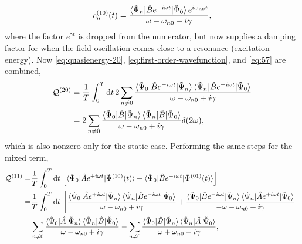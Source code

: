 \documentclass[%
class = book,%
crop = false,%
float = true,%
multi = true,%
preview = false,%
]{standalone}
\begin{document}
\begin{equation}
  \label{eq:57}
  c_{n}^{(10)}(t) = \frac{\braket{\tilde{\Psi}_{n}|\hat{B}e^{-i\omega t}|\tilde{\Psi}_{0}}e^{i\omega_{n0}t}}{\omega - \omega_{n0} + i\gamma},
\end{equation} %
where the factor \(e^{\gamma t}\) is dropped from the numerator, but now supplies a damping factor for when the field oscillation comes close to a resonance (excitation energy). Now \eqref{eq:quasienergy-20}, \eqref{eq:first-order-wavefunction}, and \eqref{eq:57} are combined,
\begin{equation}
  \label{eq:58}
  \begin{aligned}
    \mathcal{Q}^{(20)} &= \frac{1}{T} \int_{0}^{T} \mathrm{d}t \, 2\sum_{n\neq 0} \frac{\braket{\tilde{\Psi}_{0}|\hat{B}e^{-i\omega t}|\tilde{\Psi}_{n}}\braket{\tilde{\Psi}_{n}|\hat{B}e^{-i\omega t}|\tilde{\Psi}_{0}}}{\omega - \omega_{n0} + i\gamma} \\
    &= 2\sum_{n\neq 0} \frac{\braket{\tilde{\Psi}_{0}|\hat{B}|\tilde{\Psi}_{n}}\braket{\tilde{\Psi}_{n}|\hat{B}|\tilde{\Psi}_{0}}}{\omega - \omega_{n0} + i\gamma} \delta(2\omega),
  \end{aligned}
\end{equation}
which is also nonzero only for the static case. Performing the same steps for the mixed term,
\begin{equation}
  \label{eq:59}
  \begin{aligned}
    \mathcal{Q}^{(11)} = &\frac{1}{T} \int_{0}^{T} \mathrm{d}t \, \left[ \braket{\tilde{\Psi}_{0}|\hat{A}e^{+i\omega t}|\tilde{\Psi}^{(10)}(t)} + \braket{\tilde{\Psi}_{0}|\hat{B}e^{-i\omega t}|\tilde{\Psi}^{(01)}(t)} \right] \\
    = &\frac{1}{T} \int_{0}^{T} \mathrm{d}t \, \left[ \frac{\braket{\tilde{\Psi}_{0}|\hat{A}e^{+i\omega t}|\tilde{\Psi}_{n}}\braket{\tilde{\Psi}_{n}|\hat{B}e^{-i\omega t}|\tilde{\Psi}_{0}}}{\omega - \omega_{n0} + i\gamma} + \frac{\braket{\tilde{\Psi}_{0}|\hat{B}e^{-i\omega t}|\tilde{\Psi}_{n}}\braket{\tilde{\Psi}_{n}|\hat{A}e^{+i\omega t}|\tilde{\Psi}_{0}}}{-\omega - \omega_{n0} + i\gamma} \right]  \\
    = &\sum_{n\neq 0} \frac{\braket{\tilde{\Psi}_{0}|\hat{A}|\tilde{\Psi}_{n}}\braket{\tilde{\Psi}_{n}|\hat{B}|\tilde{\Psi}_{0}}}{\omega - \omega_{n0} + i\gamma} - \sum_{n\neq 0} \frac{\braket{\tilde{\Psi}_{0}|\hat{B}|\tilde{\Psi}_{n}}\braket{\tilde{\Psi}_{n}|\hat{A}|\tilde{\Psi}_{0}}}{\omega + \omega_{n0} - i\gamma},
  \end{aligned}
\end{equation}
\end{document}
